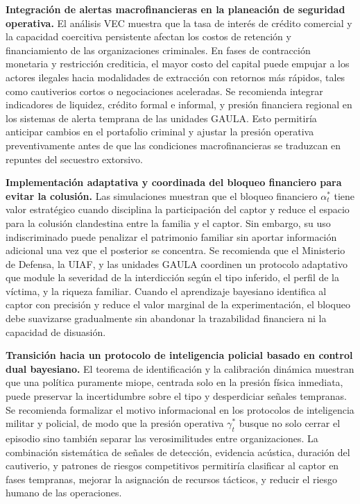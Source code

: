 \documentclass[review,authoryear,12pt]{elsarticle}
\theoremstyle{plain}
\theoremstyle{definition}
\newcommand{\1}{\mathbf{1}}
\begin{document}
\textbf{Integración de alertas macrofinancieras en la planeación de seguridad operativa.}\quad
El análisis VEC muestra que la tasa de interés de crédito comercial y la capacidad coercitiva persistente afectan los costos de retención y financiamiento de las organizaciones criminales. En fases de contracción monetaria y restricción crediticia, el mayor costo del capital puede empujar a los actores ilegales hacia modalidades de extracción con retornos más rápidos, tales como cautiverios cortos o negociaciones aceleradas. Se recomienda integrar indicadores de liquidez, crédito formal e informal, y presión financiera regional en los sistemas de alerta temprana de las unidades GAULA. Esto permitiría anticipar cambios en el portafolio criminal y ajustar la presión operativa preventivamente antes de que las condiciones macrofinancieras se traduzcan en repuntes del secuestro extorsivo.

\textbf{Implementación adaptativa y coordinada del bloqueo financiero para evitar la colusión.}\quad
Las simulaciones muestran que el bloqueo financiero $\alpha_t^\ast$ tiene valor estratégico cuando disciplina la participación del captor y reduce el espacio para la colusión clandestina entre la familia y el captor. Sin embargo, su uso indiscriminado puede penalizar el patrimonio familiar sin aportar información adicional una vez que el posterior se concentra. Se recomienda que el Ministerio de Defensa, la UIAF, y las unidades GAULA coordinen un protocolo adaptativo que module la severidad de la interdicción según el tipo inferido, el perfil de la víctima, y la riqueza familiar. Cuando el aprendizaje bayesiano identifica al captor con precisión y reduce el valor marginal de la experimentación, el bloqueo debe suavizarse gradualmente sin abandonar la trazabilidad financiera ni la capacidad de disuasión.

\textbf{Transición hacia un protocolo de inteligencia policial basado en control dual bayesiano.}\quad
El teorema de identificación y la calibración dinámica muestran que una política puramente miope, centrada solo en la presión física inmediata, puede preservar la incertidumbre sobre el tipo y desperdiciar señales tempranas. Se recomienda formalizar el motivo informacional en los protocolos de inteligencia militar y policial, de modo que la presión operativa $\gamma_t^\ast$ busque no solo cerrar el episodio sino también separar las verosimilitudes entre organizaciones. La combinación sistemática de señales de detección, evidencia acústica, duración del cautiverio, y patrones de riesgos competitivos permitiría clasificar al captor en fases tempranas, mejorar la asignación de recursos tácticos, y reducir el riesgo humano de las operaciones.
\end{document}
